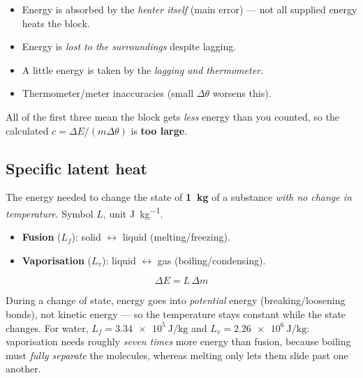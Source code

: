 \documentclass[11pt,a4paper]{article}
\newcommand{\dtheta}{\Delta\theta}
\newcommand{\dE}{\Delta E}
\begin{document}
\begin{keybox}
\begin{itemize}[leftmargin=1.4em,itemsep=1pt]
  \item Energy is absorbed by the \emph{heater itself} (main error) --- not all supplied
        energy heats the block.
  \item Energy is \emph{lost to the surroundings} despite lagging.
  \item A little energy is taken by the \emph{lagging and thermometer}.
  \item Thermometer/meter inaccuracies (small $\dtheta$ worsens this).
\end{itemize}
All of the first three mean the block gets \emph{less} energy than you counted, so the
calculated $c = \dE/(m\dtheta)$ is \textbf{too large}.
\end{keybox}

\subsection{Specific latent heat}

\begin{defbox}
The energy needed to change the state of \textbf{\SI{1}{\kilogram}} of a substance
\emph{with no change in temperature}. Symbol $L$, unit \si{\joule\per\kilogram}.
\begin{itemize}[leftmargin=1.3em,itemsep=0pt]
  \item \textbf{Fusion} ($L_f$): solid $\leftrightarrow$ liquid (melting/freezing).
  \item \textbf{Vaporisation} ($L_v$): liquid $\leftrightarrow$ gas (boiling/condensing).
\end{itemize}
\end{defbox}

\[
\boxed{\;\dE = L\,\Delta m\;}
\]

During a change of state, energy goes into \emph{potential} energy (breaking/loosening
bonds), not kinetic energy --- so the temperature stays constant while the state changes.
For water, $L_f = \SI{3.34e5}{\joule\per\kilogram}$ and
$L_v = \SI{2.26e6}{\joule\per\kilogram}$: vaporisation needs roughly \emph{seven times}
more energy than fusion, because boiling must \emph{fully separate} the molecules, whereas
melting only lets them slide past one another.
\end{document}
